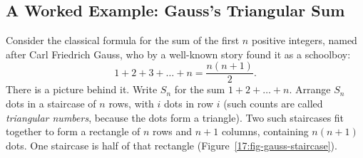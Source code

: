 \subsection{A Worked Example: Gauss's Triangular Sum}

Consider the classical formula for the sum of the first $n$ positive integers, named after Carl Friedrich Gauss, who by a well-known story found it as a schoolboy:
\[
1 + 2 + 3 + \dots + n = \frac{n(n+1)}{2}.
\]
There is a picture behind it. Write $S_n$ for the sum $1 + 2 + \dots + n$. Arrange $S_n$ dots in a staircase of $n$ rows, with $i$ dots in row $i$ (such counts are called \emph{triangular numbers}, because the dots form a triangle). Two such staircases fit together to form a rectangle of $n$ rows and $n+1$ columns, containing $n(n+1)$ dots. One staircase is half of that rectangle (Figure~\ref{17:fig-gauss-staircase}).


